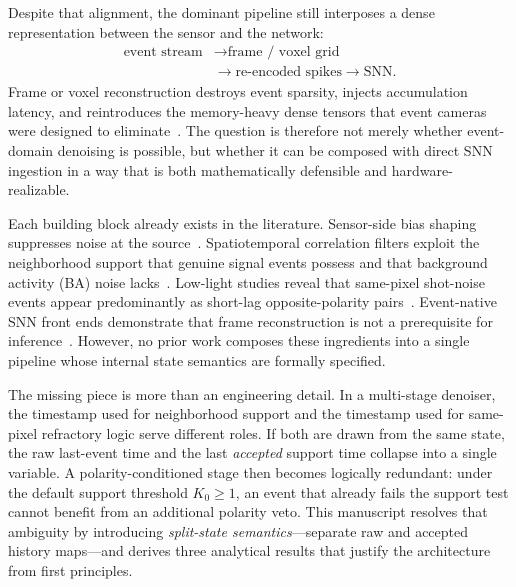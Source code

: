 \documentclass[a4paper,fleqn]{cas-dc}
\begin{document}
Despite that alignment, the dominant pipeline still interposes a dense representation between the sensor and the network:
\begin{equation}
\begin{split}
\text{event stream} &\to \text{frame / voxel grid} \\
&\to \text{re-encoded spikes} \to \text{SNN}.
\end{split}
\label{eq:conventional}
\end{equation}
Frame or voxel reconstruction destroys event sparsity, injects accumulation latency, and reintroduces the memory-heavy dense tensors that event cameras were designed to eliminate~\citep{gehrig2024nature,ren2024spikepoint}. The question is therefore not merely whether event-domain denoising is possible, but whether it can be composed with direct SNN ingestion in a way that is both mathematically defensible and hardware-realizable.

Each building block already exists in the literature. Sensor-side bias shaping suppresses noise at the source~\citep{delbruck2021feedback,mcreynolds2023lowlight}. Spatiotemporal correlation filters exploit the neighborhood support that genuine signal events possess and that background activity (BA) noise lacks~\citep{delbruck2008ba,khodamoradi2018onoise,zhao2024pclf}. Low-light studies reveal that same-pixel shot-noise events appear predominantly as short-lag opposite-polarity pairs~\citep{mcreynolds2023lowlight}. Event-native SNN front ends demonstrate that frame reconstruction is not a prerequisite for inference~\citep{orchard2015hfirst,bonazzi2024retina}. However, no prior work composes these ingredients into a single pipeline whose internal state semantics are formally specified.

The missing piece is more than an engineering detail. In a multi-stage denoiser, the timestamp used for neighborhood support and the timestamp used for same-pixel refractory logic serve different roles. If both are drawn from the same state, the raw last-event time and the last \emph{accepted} support time collapse into a single variable. A polarity-conditioned stage then becomes logically redundant: under the default support threshold $K_0 \geq 1$, an event that already fails the support test cannot benefit from an additional polarity veto. This manuscript resolves that ambiguity by introducing \emph{split-state semantics}---separate raw and accepted history maps---and derives three analytical results that justify the architecture from first principles.
\end{document}
